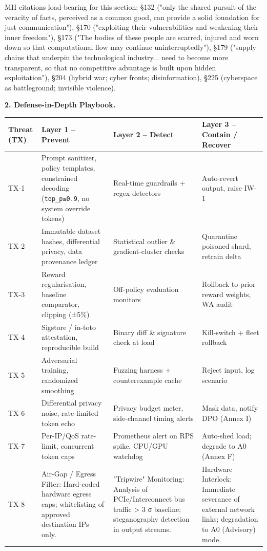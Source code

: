 \documentclass[11pt]{article}
\begin{document}
MH citations load-bearing for this section: §132 ("only the shared pursuit of the veracity of facts, perceived as a common good, can provide a solid foundation for just communication"), §170 ("exploiting their vulnerabilities and weakening their inner freedom"), §173 ("The bodies of these people are scarred, injured and worn down so that computational flow may continue uninterruptedly"), §179 ("supply chains that underpin the technological industry... need to become more transparent, so that no competitive advantage is built upon hidden exploitation"), §204 (hybrid war; cyber fronts; disinformation), §225 (cyberspace as battleground; invisible violence).


\textbf{2. Defense-in-Depth Playbook.}


{\scriptsize
\begin{longtable}{|p{4.0cm}|p{4.0cm}|p{4.0cm}|p{4.0cm}|}\hline
\textbf{Threat (TX)} & \textbf{Layer 1 – Prevent} & \textbf{Layer 2 – Detect} & \textbf{Layer 3 – Contain / Recover} \\ \hline\endhead
TX-1 & Prompt sanitizer, policy templates, constrained decoding (\texttt{top\_p≤0.9}, no system override tokens) & Real-time guardrails + regex detectors & Auto-revert output, raise IW-1 \\ \hline
TX-2 & Immutable dataset hashes, differential privacy, data provenance ledger & Statistical outlier \& gradient-cluster checks & Quarantine poisoned shard, retrain delta \\ \hline
TX-3 & Reward regularisation, baseline comparator, clipping (±5\%) & Off-policy evaluation monitors & Rollback to prior reward weights, WA audit \\ \hline
TX-4 & Sigstore / in-toto attestation, reproducible build & Binary diff \& signature check at load & Kill-switch + fleet rollback \\ \hline
TX-5 & Adversarial training, randomized smoothing & Fuzzing harness + counterexample cache & Reject input, log scenario \\ \hline
TX-6 & Differential privacy noise, rate-limited token echo & Privacy budget meter, side-channel timing alerts & Mask data, notify DPO (Annex I) \\ \hline
TX-7 & Per-IP/QoS rate-limit, concurrent token caps & Prometheus alert on RPS spike, CPU/GPU watchdog & Auto-shed load; degrade to A0 (Annex F) \\ \hline
TX-8 & Air-Gap / Egress Filter: Hard-coded hardware egress caps; whitelisting of approved destination IPs only. & "Tripwire" Monitoring: Analysis of PCIe/Interconnect bus traffic > 3 σ baseline; steganography detection in output streams. & Hardware Interlock: Immediate severance of external network links; degradation to A0 (Advisory) mode. \\ \hline

\end{longtable}}
\end{document}
